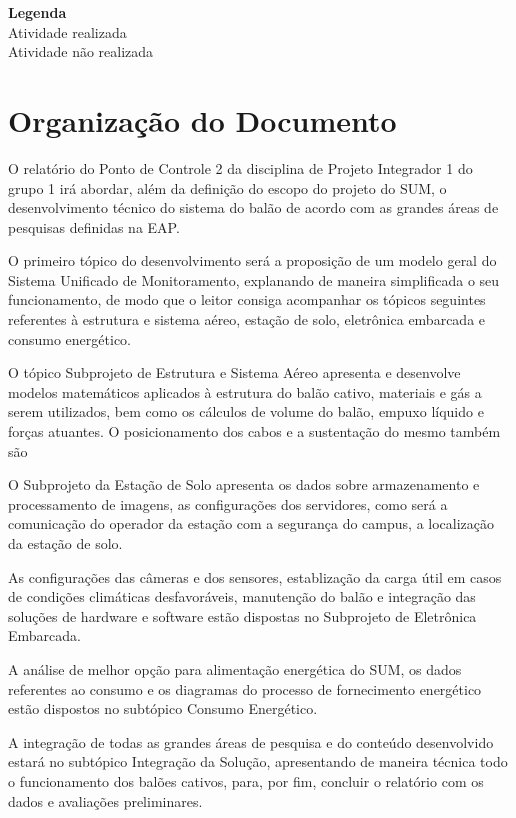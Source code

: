\textbf{Legenda} \\
  \color[HTML]{3166FF}Atividade realizada \\
  \color[HTML]{FE0000}Atividade não realizada
  \color[HTML]{000000}


\section{Organização do Documento} %
\label{sec:organiza_o_do_documento}

  O relatório do Ponto de Controle 2 da disciplina de Projeto Integrador 1 do grupo 1 irá abordar, além da definição do escopo do projeto do SUM, o desenvolvimento técnico do sistema do balão de acordo com as grandes áreas de pesquisas definidas na EAP.

  O primeiro tópico do desenvolvimento será a proposição de um modelo geral do Sistema Unificado de Monitoramento, explanando de maneira simplificada o seu funcionamento, de modo que o leitor consiga acompanhar os tópicos seguintes referentes à estrutura e sistema aéreo, estação de solo, eletrônica embarcada e consumo energético.

  O tópico Subprojeto de Estrutura e Sistema Aéreo apresenta e desenvolve modelos matemáticos aplicados à estrutura do balão cativo, materiais e gás a serem utilizados, bem como os cálculos de volume do balão, empuxo líquido e forças atuantes. O posicionamento dos cabos e a sustentação do mesmo também são

  O Subprojeto da Estação de Solo apresenta os dados sobre armazenamento e processamento de imagens, as configurações dos servidores, como será a comunicação  do operador da estação com a segurança do campus, a localização da estação de solo.

  As configurações das câmeras e dos sensores, establização da carga útil em casos de condições climáticas desfavoráveis, manutenção do balão e integração das soluções de hardware e software estão dispostas no Subprojeto de Eletrônica Embarcada.

  A análise de melhor opção para alimentação energética do SUM, os dados referentes ao consumo e os diagramas do processo de fornecimento energético estão dispostos no subtópico Consumo Energético.

  A integração de todas as grandes áreas de pesquisa e do conteúdo desenvolvido estará no subtópico Integração da Solução, apresentando de maneira técnica todo o funcionamento dos balões cativos, para, por fim, concluir o relatório com os dados e avaliações preliminares.
